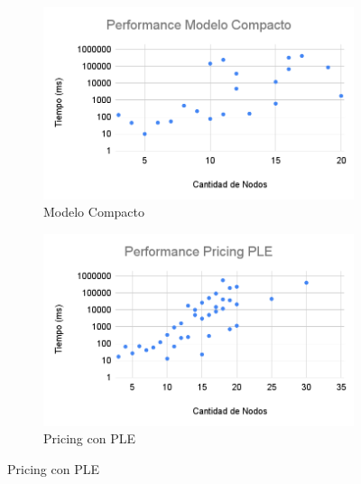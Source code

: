\begin{figure}[H]
     \centering
     \begin{subfigure}[b]{0.45\textwidth}
         \centering
         \includegraphics[width=\textwidth]{img/Performance Modelo Compacto.png}
         \caption{Modelo Compacto}
     \end{subfigure}
     \hfill
     \begin{subfigure}[b]{0.45\textwidth}
         \centering
         \includegraphics[width=\textwidth]{img/Performance Pricing PLE.png}
         \caption{Pricing con PLE}
     \end{subfigure}


\end{figure}
